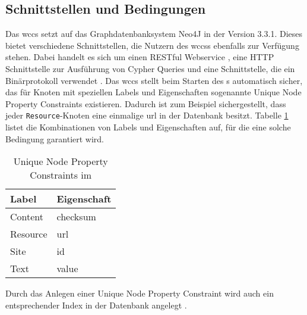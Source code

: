 \subsection{Schnittstellen und Bedingungen}
    \label{section:solutionDetailsPersistenceDatabse}
    Das \gls{wccs} setzt auf das Graphdatenbanksystem Neo4J in der Version 3.3.1.
    Dieses bietet verschiedene Schnittstellen, die Nutzern des \glspl{wccs} ebenfalls zur Verfügung stehen.
    Dabei handelt es sich um einen RESTful Webservice \cite{neo4j:restDocumentation},
    eine HTTP Schnittstelle zur Ausführung von Cypher Queries \cite[Kapitel 5]{neo4j:documentation}
    und eine Schnittstelle, die ein Binärprotokoll verwendet \cite[Kapitel 4]{neo4j:documentation}.
    Das \gls{wccs} stellt beim Starten des {\classificationStorage}s automatisch sicher,
    das für Knoten mit speziellen Labels und Eigenschaften sogenannte
    Unique Node Property Constraints
    \cite[Kapitel 3.5.2.2]{neo4j:documentation} existieren.
    Dadurch ist zum Beispiel sichergestellt,
    dass jeder \texttt{Resource}-Knoten eine einmalige \gls{url} in der Datenbank besitzt.
    Tabelle \ref{table:solutionDetailsPersistenceDatabaseConstraints}
    listet die Kombinationen von Labels und Eigenschaften auf,
    für die eine solche Bedingung garantiert wird.

    \begin{table}[htb]
        \centering
        \begin{tabular}{|l|l|}
            \hline
            \textbf{Label} & \textbf{Eigenschaft} \\ \hline
            Content        & checksum             \\ \hline
            Resource       & url                  \\ \hline
            Site           & id                   \\ \hline
            Text           & value                \\ \hline
        \end{tabular}
        \caption{Unique Node Property Constraints im {\classificationStorage}}
        \label{table:solutionDetailsPersistenceDatabaseConstraints}
    \end{table}

    Durch das Anlegen einer Unique Node Property Constraint wird auch ein entsprechender Index in der Datenbank angelegt
    \cite[Kapitel 3.5.2.2]{neo4j:documentation}. 
